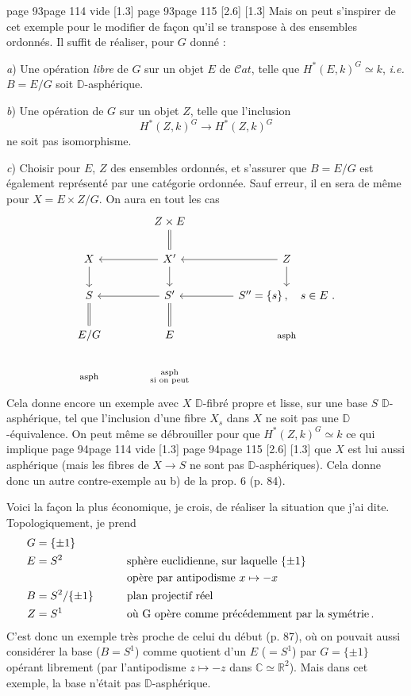 \documentclass[11pt,leqno]{article}
\newcommand{\printedpage}[1]{\marginnote{\scriptsize\sffamily ed.\ #1}}
\newcommand{\msp}[1]{%
  \begingroup\def\thismsp{#1}\def\blankmsp{page 114 vide}%
  \ifx\thismsp\blankmsp
    \marginnote{\scriptsize\sffamily [114: vide]}[1.3\baselineskip]%
  \else\def\followingmsp{page 115}%
    \ifx\thismsp\followingmsp
      \marginnote{\scriptsize\sffamily [page 115]}[2.6\baselineskip]%
    \else\marginnote{\scriptsize\sffamily [#1]}[1.3\baselineskip]\fi
  \fi\endgroup}
\newcommand{\D}{\ensuremath{\mathbb{D}}}
\newcommand{\Cat}{\ensuremath{\mathcal{C}at}}
\newcommand{\RR}{\ensuremath{\mathbb{R}}}
\begin{document}
\printedpage{57}

\msp{page 93}
Mais on peut s'inspirer de cet exemple pour le modifier de façon qu'il se transpose à des ensembles ordonnés. Il suffit de réaliser, pour $G$ donné :

\textit{a}) Une opération \textit{libre} de $G$ sur un objet $E$ de $\Cat$, telle que $H^*(E,k)^G \simeq k$, \textit{i.e.} $B = E/G$ soit $\D$-asphérique.

\textit{b}) Une opération de $G$ sur un objet $Z$, telle que l'inclusion
\[ H^*(Z,k)^G \longrightarrow H^*(Z,k)^G \] %
ne soit pas isomorphisme.

\textit{c}) Choisir pour $E$, $Z$ des ensembles ordonnés, et s'assurer que $B = E/G$ est également représenté par une catégorie ordonnée. Sauf erreur, il en sera de même pour $X = E \times Z/G$. On aura en tout les cas %
\[
\begin{tikzcd}[column sep=large]
 & Z \times E \arrow[d, equal] & \\
X \arrow[d] & X' \arrow[l] \arrow[d] & Z \arrow[l] \arrow[d] \\
S \arrow[d, equal] & S' \arrow[l] \arrow[d, equal] & S'' = \{s\}\, , \quad s \in E \ . \arrow[l] \\
E/G & E & \text{\footnotesize asph} \\
\text{\footnotesize asph} & \substack{\text{asph} \\ \text{si on peut}} &
\end{tikzcd}
\]
Cela donne encore un exemple avec $X$ $\D$-fibré propre et lisse, sur une base $S$ $\D$-asphérique, tel que l'inclusion d'une fibre $X_s$ dans $X$ ne soit pas une $\D$-équivalence. On peut même se débrouiller pour que $H^*(Z,k)^G \simeq k$ ce qui implique
\msp{page 94}
que $X$ est lui aussi asphérique (mais les fibres de $X \to S$ ne sont pas $\D$-asphériques). Cela donne donc un autre contre-exemple au b) de la prop. 6 (p. 84).

Voici la façon la plus économique, je crois, de réaliser la situation que j'ai dite. Topologiquement, je prend %
\[
\begin{aligned}
G &= \{\pm 1\} \\
E &= S^2 &\qquad& \text{sphère euclidienne, sur laquelle } \{\pm 1\} \\
  &      &&      \text{opère par antipodisme } x \mapsto -x \\
B &= S^2/\{\pm 1\} && \text{plan projectif réel} \\
Z &= S^1 && \text{où G opère comme précédemment par la symétrie\,.}
\end{aligned}
\]
C'est donc un exemple très proche de celui du début (p. 87), où on pouvait aussi considérer la base ($B = S^1$) comme quotient d'un $E$ ($= S^1$) par $G = \{\pm 1\}$ opérant librement (par
\printedpage{58}
l'antipodisme $z \mapsto -z$ dans $\mathbb{C} \simeq \RR^2$). Mais dans cet exemple, la base n'était pas $\D$-asphérique.
\end{document}
